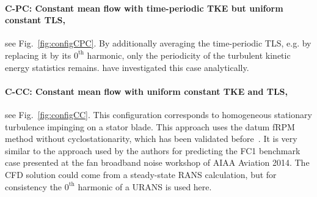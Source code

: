 \paragraph{{\bf C-PC}: Constant mean flow with time-periodic TKE but uniform constant TLS,}
see Fig.~\ref{fig:configCPC}.
By additionally averaging the time-periodic TLS, e.g. by replacing it by its $0^\text{th}$ harmonic, only the periodicity of the turbulent kinetic energy statistics remains. \citet{dieste_random_2012} have investigated this case analytically.

\paragraph{{\bf C-CC}: Constant mean flow with uniform constant TKE and TLS,} see Fig.~\ref{fig:configCC}.
This configuration corresponds to homogeneous stationary turbulence impinging on a stator blade. This approach uses the datum fRPM method without cyclostationarity, which has been validated before~\cite{wohlbrandt_simultaneous_2013}. It is very similar to the approach used by the authors for predicting the FC1 benchmark case presented at the fan broadband noise workshop of AIAA Aviation 2014.  The CFD solution could come from a steady-state RANS calculation, but for consistency the $0^\text{th}$ harmonic of a URANS is used here.


% 
% 


